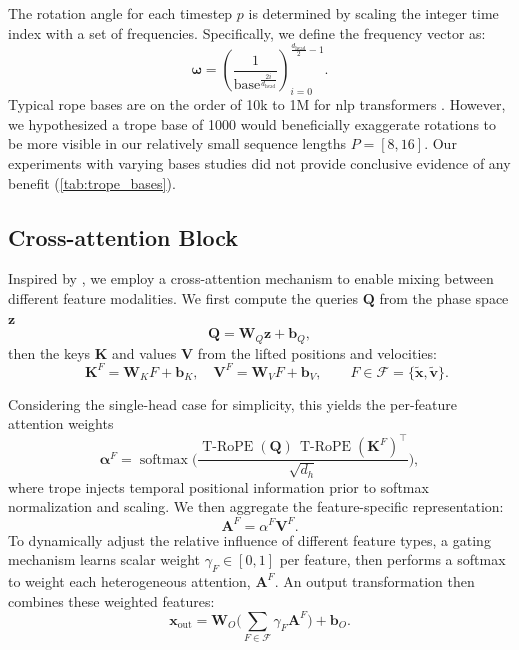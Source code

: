 The rotation angle for each timestep \( p \) is determined by scaling the integer time index with a set of frequencies. Specifically, we define the frequency vector as: 
\begin{equation}
    \boldsymbol{\omega} = \left(\frac{1}{\text{base}^{\frac{2i}{d_{\text{head}}}}} \right)_{i=0}^{\frac{d_{\text{head}}}{2} - 1}.
\end{equation}
Typical \gls{rope} bases are on the order of 10k to 1M for \gls{nlp} transformers \cite{su_roformer_2023, jiang_mixtral_2024, men_base_2024}. However, we hypothesized a \gls{trope} base of 1000 would beneficially exaggerate rotations to be more visible in our relatively small sequence lengths \(P = [8,16]\). Our experiments with varying bases studies did not provide conclusive evidence of any benefit (\cref{tab:trope_bases}).

\subsection{Cross-attention Block}
\label{sec:cross_attention}
Inspired by \cite{hao_gnot_2023}, we employ a cross-attention mechanism to enable mixing between different feature modalities. We first compute the queries \(\mathbf{Q}\) from the phase space \(\mathbf{z}\)
\begin{equation}
    \mathbf{Q} = \mathbf W_{Q}\mathbf{z} + \mathbf{b}_{Q}, 
\end{equation}
then the keys \(\mathbf{K}\) and values \(\mathbf{V}\) from the lifted positions and velocities:
\begin{equation}
     \quad \mathbf{K}^F =  \mathbf{W}_K F + \mathbf{b}_K, \quad \mathbf{V}^F =  \mathbf{W}_V F + \mathbf{b}_V, \qquad F \in \mathcal{F} = \{\tilde{\mathbf{x}}, \tilde{\mathbf{v}}\}.
\end{equation}

Considering the single-head case for simplicity, this yields the per-feature attention weights
\begin{equation}
    \mathbf{\alpha}^F = \operatorname{softmax} \Biggl( \frac{ \operatorname{T-RoPE}(\mathbf{Q}) \, \operatorname{T-RoPE}(\mathbf{K}^F)^\top}{\sqrt{d_h}} \Biggr),
\end{equation}
where \gls{trope} injects temporal positional information prior to softmax normalization and scaling. We then aggregate the feature-specific representation:
\begin{equation}
    \mathbf{A}^F = \alpha^F\mathbf{V}^F \label{eq:cross_attn}.
\end{equation}
To dynamically adjust the relative influence of different feature types, a gating mechanism learns scalar weight \( \gamma_F \in [0,1] \) per feature, then performs a softmax to weight each heterogeneous attention, \( \mathbf{A}^F \). An output transformation then combines these weighted features:
\begin{equation}
    \mathbf{x}_{\text{out}} = \mathbf{W}_O\Biggl( \sum_{F \in \mathcal{F}} \gamma_F \mathbf{A}^F \Biggr) + \mathbf{b}_O.
\end{equation}

